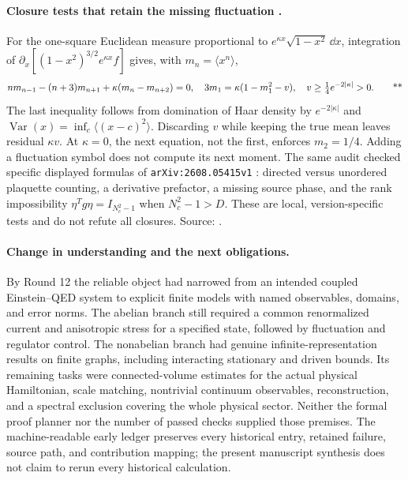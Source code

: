 \paragraph{Closure tests that retain the missing fluctuation \workstar.}
For the one-square Euclidean measure proportional to
\(e^{\kappa x}\sqrt{1-x^2}\,\dd x\), integration of
\(\partial_x[(1-x^2)^{3/2}e^{\kappa x}f]\) gives, with \(m_n=\langle x^n\rangle\),
\begin{equation}
 n m_{n-1}-(n+3)m_{n+1}+\kappa(m_n-m_{n+2})=0,
 \quad 3m_1=\kappa(1-m_1^2-v),
 \quad v\ge\tfrac14e^{-2|\kappa|}>0.
 \qquad\text{**}\label{early:closure}
\end{equation}
The last inequality follows from domination of Haar density by
\(e^{-2|\kappa|}\) and \(\operatorname{Var}(x)=\inf_c\langle(x-c)^2\rangle\).
Discarding \(v\) while keeping the true mean leaves residual \(\kappa v\).
At \(\kappa=0\), the next equation, not the first, enforces \(m_2=1/4\).
Adding a fluctuation symbol does not compute its next moment.
The same audit checked specific displayed formulas of
\texttt{arXiv:2608.05415v1} \cite{chatterjee2026lattice}: directed versus unordered plaquette counting,
a derivative prefactor, a missing source phase, and the rank impossibility
\(\eta^Tg\eta=I_{N_c^2-1}\) when \(N_c^2-1>D\).
These are local, version-specific tests and do not refute all closures.
Source: .

\paragraph{Change in understanding and the next obligations.}
By Round 12 the reliable object had narrowed from an intended coupled
Einstein--QED system to explicit finite models with named observables, domains,
and error norms.  The abelian branch still required a common renormalized
current and anisotropic stress for a specified state, followed by fluctuation
and regulator control.  The nonabelian branch had genuine infinite-representation
results on finite graphs, including interacting stationary and driven bounds.
Its remaining tasks were connected-volume estimates for the actual physical
Hamiltonian, scale matching, nontrivial continuum observables, reconstruction,
and a spectral exclusion covering the whole physical sector.  Neither the
formal proof planner nor the number of passed checks supplied those premises.
The machine-readable early ledger preserves every historical entry, retained
failure, source path, and contribution mapping; the present manuscript synthesis
does not claim to rerun every historical calculation.

